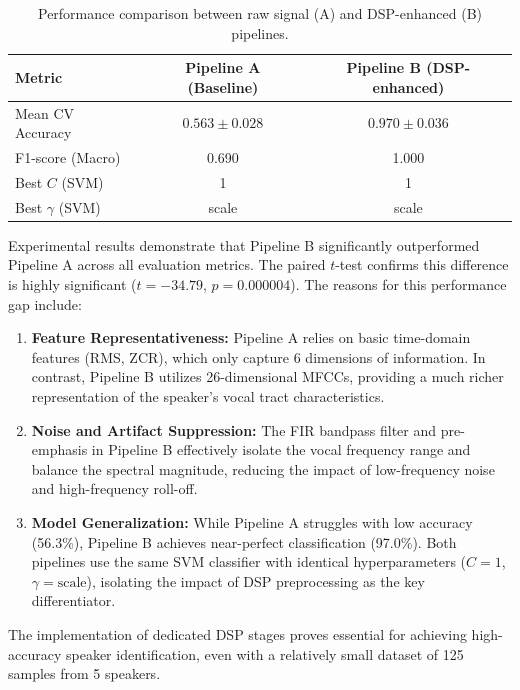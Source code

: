\begin{table}[ht]
\centering
\begin{tabular}{|l|c|c|}
\hline
\textbf{Metric} & \textbf{Pipeline A (Baseline)} & \textbf{Pipeline B (DSP-enhanced)} \\
\hline
Mean CV Accuracy & $0.563 \pm 0.028$ & $0.970 \pm 0.036$ \\
F1-score (Macro) & 0.690 & 1.000 \\
Best $C$ (SVM) & 1 & 1 \\
Best $\gamma$ (SVM) & scale & scale \\
\hline
\end{tabular}
\caption{Performance comparison between raw signal (A) and DSP-enhanced (B) pipelines.}
\end{table}

Experimental results demonstrate that Pipeline B significantly outperformed Pipeline A across all evaluation metrics. The paired $t$-test confirms this difference is highly significant ($t = -34.79$, $p = 0.000004$). The reasons for this performance gap include:

\begin{enumerate}
\item \textbf{Feature Representativeness:} Pipeline A relies on basic time-domain features (RMS, ZCR), which only capture 6 dimensions of information. In contrast, Pipeline B utilizes 26-dimensional MFCCs, providing a much richer representation of the speaker's vocal tract characteristics.

\item \textbf{Noise and Artifact Suppression:} The FIR bandpass filter and pre-emphasis in Pipeline B effectively isolate the vocal frequency range and balance the spectral magnitude, reducing the impact of low-frequency noise and high-frequency roll-off.

\item \textbf{Model Generalization:} While Pipeline A struggles with low accuracy (56.3\%), Pipeline B achieves near-perfect classification (97.0\%). Both pipelines use the same SVM classifier with identical hyperparameters ($C=1$, $\gamma=\text{scale}$), isolating the impact of DSP preprocessing as the key differentiator.
\end{enumerate}

The implementation of dedicated DSP stages proves essential for achieving high-accuracy speaker identification, even with a relatively small dataset of 125 samples from 5 speakers.
